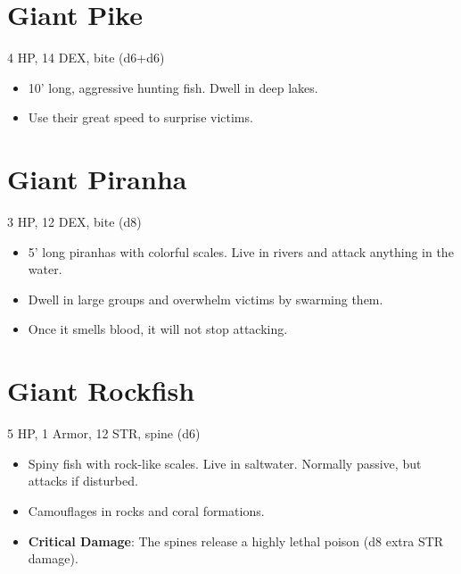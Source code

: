 \documentclass[
  10pt,
  american,
]{article}
\begin{document}
\hypertarget{giant-pike}{%
\section{Giant Pike}\label{giant-pike}}

4 HP, 14 DEX, bite (d6+d6)

\begin{samepage}
\begin{itemize}
\setlength\itemsep{-.5em}
\item 10’ long, aggressive hunting fish. Dwell in deep lakes.
\item Use their great speed to surprise victims.
\end{itemize}
\end{samepage}

\hypertarget{giant-piranha}{%
\section{Giant Piranha}\label{giant-piranha}}

3 HP, 12 DEX, bite (d8)

\begin{samepage}
\begin{itemize}
\setlength\itemsep{-.5em}
\item 5’ long piranhas with colorful scales.   Live in rivers and attack anything in the water.
\item Dwell in large groups and overwhelm victims by swarming them.
\item Once it smells blood, it will not stop attacking.
\end{itemize}
\end{samepage}

\hypertarget{giant-rockfish}{%
\section{Giant Rockfish}\label{giant-rockfish}}

5 HP, 1 Armor, 12 STR, spine (d6)

\begin{samepage}
\begin{itemize}
\setlength\itemsep{-.5em}
\item Spiny fish with rock-like scales. Live in saltwater. Normally passive, but attacks if disturbed.
\item Camouflages in rocks and coral formations.
\item \textbf{Critical Damage}: The spines release a highly lethal poison (d8 extra STR damage).
\end{itemize}
\end{samepage}
\end{document}
